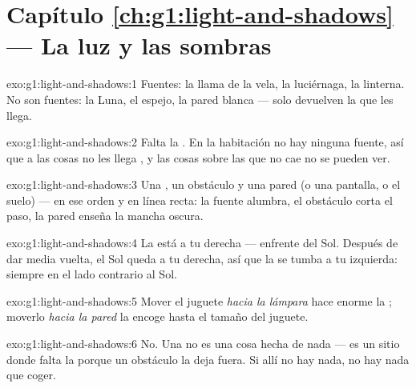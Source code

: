 \section*{Capítulo \ref{ch:g1:light-and-shadows} --- La luz y las sombras}

\begin{solution}{exo:g1:light-and-shadows:1}
Fuentes: la llama de la vela, la luciérnaga, la linterna. No son
fuentes: la Luna, el espejo, la pared blanca --- solo devuelven la
 que les llega.
\end{solution}

\begin{solution}{exo:g1:light-and-shadows:2}
Falta la . En la habitación no hay ninguna fuente, así que a las
cosas no les llega , y las cosas sobre las que no cae  no se
pueden ver.
\end{solution}

\begin{solution}{exo:g1:light-and-shadows:3}
Una , un obstáculo y una pared (o una pantalla, o el
suelo) --- en ese orden y en línea recta: la fuente alumbra, el
obstáculo corta el paso, la pared enseña la mancha oscura.
\end{solution}

\begin{solution}{exo:g1:light-and-shadows:4}
La  está a tu derecha --- enfrente del Sol. Después de dar
media vuelta, el Sol queda a tu derecha, así que la  se tumba a
tu izquierda: siempre en el lado contrario al Sol.
\end{solution}

\begin{solution}{exo:g1:light-and-shadows:5}
Mover el juguete \emph{hacia la lámpara} hace enorme la ;
moverlo \emph{hacia la pared} la encoge hasta el tamaño del juguete.
\end{solution}

\begin{solution}{exo:g1:light-and-shadows:6}
No. Una  no es una cosa hecha de nada --- es un sitio donde
falta la  porque un obstáculo la deja fuera. Si allí no hay
nada, no hay nada que coger.
\end{solution}

